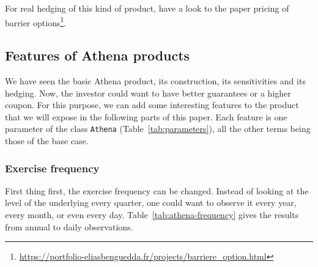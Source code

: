 \documentclass[11pt,a4paper]{article}
\newcommand{\code}[1]{\texttt{#1}}
\begin{document}
For real hedging of this kind of product, have a look to the paper pricing of barrier options\footnote{\url{https://portfolio-eliasbenguedda.fr/projects/barriere_option.html}}.

\clearpage
\subsection{Features of Athena products}

We have seen the basic Athena product, its construction, its sensitivities and its hedging. Now, the investor could
want to have better guarantees or a higher coupon. For this purpose, we can add some interesting features to the
product that we will expose in the following parts of this paper. Each feature is one parameter of the class
\code{Athena} (Table~\ref{tab:parameters}), all the other terms being those of the base case.
\clearpage
\subsubsection{Exercise frequency}

First thing first, the exercise frequency can be changed. Instead of looking at the level of the underlying every
quarter, one could want to observe it every year, every month, or even every day. Table~\ref{tab:athena-frequency}
gives the results from annual to daily observations.
\end{document}
